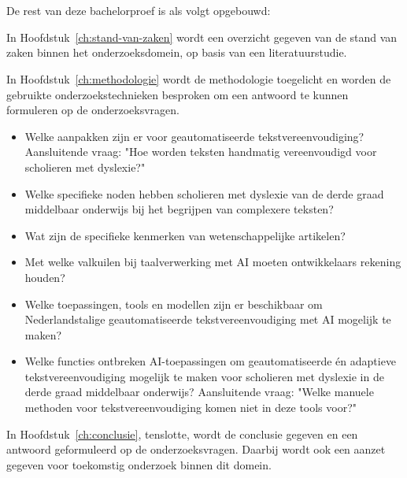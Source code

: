 \section{}%
\label{sec:opzet-bachelorproef}

De rest van deze bachelorproef is als volgt opgebouwd:

In Hoofdstuk~\ref{ch:stand-van-zaken} wordt een overzicht gegeven van de stand van zaken binnen het onderzoeksdomein, op basis van een literatuurstudie.

In Hoofdstuk~\ref{ch:methodologie} wordt de methodologie toegelicht en worden de gebruikte onderzoekstechnieken besproken om een antwoord te kunnen formuleren op de onderzoeksvragen.

\begin{itemize}
	\item Welke aanpakken zijn er voor geautomatiseerde tekstvereenvoudiging? Aansluitende vraag: "Hoe worden teksten handmatig vereenvoudigd voor scholieren met dyslexie?"
	\item Welke specifieke noden hebben scholieren met dyslexie van de derde graad middelbaar onderwijs bij het begrijpen van complexere teksten?
	\item Wat zijn de specifieke kenmerken van wetenschappelijke artikelen? 
	\item Met welke valkuilen bij taalverwerking met AI moeten ontwikkelaars rekening houden?
	\item Welke toepassingen, tools en modellen zijn er beschikbaar om Nederlandstalige geautomatiseerde tekstvereenvoudiging met AI mogelijk te maken?
	\item Welke functies ontbreken AI-toepassingen om geautomatiseerde én adaptieve tekstvereenvoudiging mogelijk te maken voor \newline scholieren met dyslexie in de derde graad middelbaar onderwijs? Aansluitende vraag: "Welke manuele methoden voor tekstvereenvoudiging komen niet in deze tools voor?"
\end{itemize}

In Hoofdstuk~\ref{ch:conclusie}, tenslotte, wordt de conclusie gegeven en een antwoord geformuleerd op de onderzoeksvragen. Daarbij wordt ook een aanzet gegeven voor toekomstig onderzoek binnen dit domein.